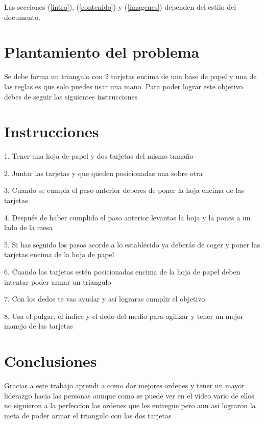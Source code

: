 \documentclass{article}
\begin{document}
Las secciones (\ref{intro}), (\ref{contenido}) y (\ref{imagenes}) dependen del estilo del documento.


\section{Plantamiento del problema}\label{Plantamiento del problema}
Se debe forma un triangulo con 2 tarjetas encima de una base de papel y una de las reglas es que solo puedes usar una mano. Para poder lograr este objetivo debes de seguir las siguientes instrucciones 

\section{Instrucciones}\label{Instrucciones}
1. Tener una hoja de papel y dos tarjetas del mismo tamaño 

2. Juntar las tarjetas y que queden posicionadas una sobre otra

3. Cuando se cumpla el paso anterior deberes de poner la hoja encima de las tarjetas

4. Después de haber cumplido el paso anterior levantas la hoja y la pones a un lado de la mesa

5. Si has seguido los pasos acorde a lo establecido ya deberás de coger y poner las tarjetas encima de la hoja de papel

6. Cuando las tarjetas estén posicionadas encima de la hoja de papel deben intentar poder armar un triangulo 

7. Con los dedos te vas ayudar y así lograras cumplir el objetivo

8. Usa el pulgar, el indice y el dedo del medio para agilizar y tener un mejor manejo de las tarjetas 


\section{Conclusiones}\label{Conclusiones}
Gracias a  este trabajo aprendi a como dar mejores ordenes y tener un mayor liderazgo hacia las personas aunque como se puede ver en el video vario de ellos no siguieron a la perfeccion las ordenes que les entregue pero aun asi lograron la meta de poder armar el triangulo con las dos tarjetas



\end{document}
